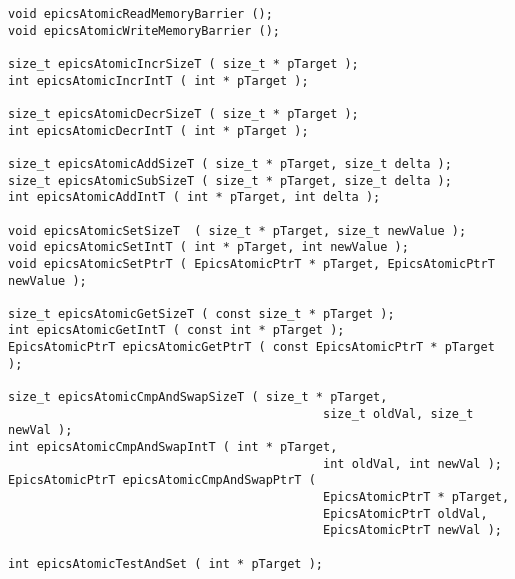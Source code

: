 \begin{verbatim}
void epicsAtomicReadMemoryBarrier ();
void epicsAtomicWriteMemoryBarrier ();

size_t epicsAtomicIncrSizeT ( size_t * pTarget );
int epicsAtomicIncrIntT ( int * pTarget );

size_t epicsAtomicDecrSizeT ( size_t * pTarget );
int epicsAtomicDecrIntT ( int * pTarget );

size_t epicsAtomicAddSizeT ( size_t * pTarget, size_t delta );
size_t epicsAtomicSubSizeT ( size_t * pTarget, size_t delta );
int epicsAtomicAddIntT ( int * pTarget, int delta );

void epicsAtomicSetSizeT  ( size_t * pTarget, size_t newValue ); 
void epicsAtomicSetIntT ( int * pTarget, int newValue );
void epicsAtomicSetPtrT ( EpicsAtomicPtrT * pTarget, EpicsAtomicPtrT newValue );

size_t epicsAtomicGetSizeT ( const size_t * pTarget );
int epicsAtomicGetIntT ( const int * pTarget );
EpicsAtomicPtrT epicsAtomicGetPtrT ( const EpicsAtomicPtrT * pTarget );

size_t epicsAtomicCmpAndSwapSizeT ( size_t * pTarget, 
                                            size_t oldVal, size_t newVal );
int epicsAtomicCmpAndSwapIntT ( int * pTarget, 
                                            int oldVal, int newVal );
EpicsAtomicPtrT epicsAtomicCmpAndSwapPtrT ( 
                                            EpicsAtomicPtrT * pTarget, 
                                            EpicsAtomicPtrT oldVal, 
                                            EpicsAtomicPtrT newVal );

int epicsAtomicTestAndSet ( int * pTarget );
\end{verbatim}

